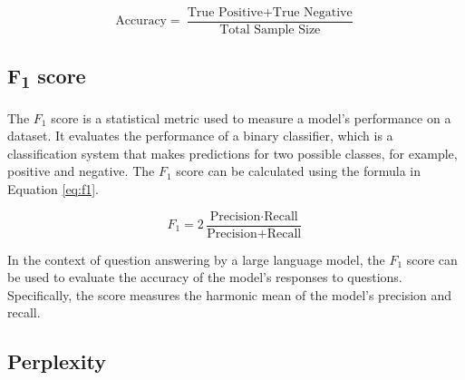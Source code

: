     \begin{equation}
        \text{Accuracy} = \frac{\text{True Positive} + \text{True Negative}}{\text{Total Sample Size}}
        \label{eq:accuracy}
    \end{equation}


    \subsection{F\textsubscript{1} score}


    The $F_1$ score is a statistical metric used to measure a model's performance on a dataset. It evaluates the performance of a binary classifier, which is a classification system that makes predictions for two possible classes, for example, positive and negative. The $F_1$ score can be calculated using the formula in Equation \ref{eq:f1}.

    \begin{equation}
        F_1 = 2 \frac{\text{Precision} \cdot \text{Recall}}{\text{Precision} + \text{Recall}}
        \label{eq:f1}
    \end{equation}

    In the context of question answering by a large language model, the $F_1$ score can be used to evaluate the accuracy of the model's responses to questions. Specifically, the score measures the harmonic mean of the model's precision and recall.

    \subsection{Perplexity}

